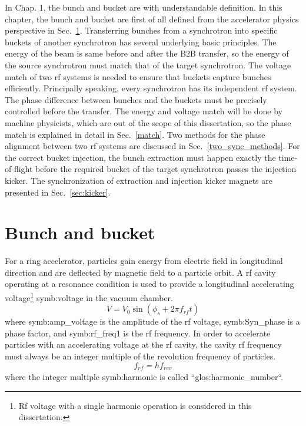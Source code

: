 In Chap. 1, the bunch and bucket are with understandable definition. In this chapter, the bunch and bucket are first of all defined from the accelerator physics perspective in Sec.~\ref{bunch and bucket}. Transferring bunches from a synchrotron into specific buckets of another synchrotron has several underlying basic principles. The energy of the beam is same before and after the B2B transfer, so the energy of the source synchrotron must match that of the target synchrotron. The voltage match of two rf systems is needed to ensure that buckets capture bunches efficiently. Principally speaking, every synchrotron has its independent rf system. The phase difference between bunches and the buckets must be precisely controlled before the transfer. The energy and voltage match will be done by machine physicists, which are out of the scope of this dissertation, so the phase match is explained in detail in Sec.~\ref{match}. Two methods for the phase alignment between two rf systems are discussed in Sec.~\ref{two_sync_methods}. For the correct bucket injection, the bunch extraction must happen exactly the time-of-flight before the required bucket of the target synchrotron passes the injection kicker. The synchronization of extraction and injection kicker magnets are presented in Sec.~\ref{sec:kicker}.

\section{Bunch and bucket}
\label{bunch and bucket}
For a ring accelerator, particles gain energy from electric field in longitudinal direction and are deflected by magnetic field to a particle orbit. A rf cavity operating at a resonance condition is used to provide a longitudinal accelerating voltage\footnote{Rf voltage with a single harmonic operation is considered in this dissertation.} \gls{symb:voltage} in the vacuum chamber.
\begin{equation}
V=V_0\sin(\phi_\mathit{s}+2\pi f_\mathit{rf}t)
\end{equation}
where \gls{symb:amp_voltage} is the amplitude of the rf voltage, \gls{symb:Syn_phase} is a phase factor, and \gls{symb:rf_freq1} is the rf frequency. In order to accelerate particles with an accelerating voltage at the rf cavity, the cavity rf frequency must always be an integer multiple of the revolution frequency of particles. 
\begin{equation}
	f_{\mathit{rf}}=hf_{\mathit{rev}}\label{harmonic_number}
\end{equation}
where the integer multiple \gls{symb:harmonic} is called ``\gls{glos:harmonic_number}``. 

